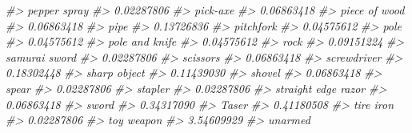 \documentclass[
]{krantz}
\makeatletter
\newenvironment{Shaded}{\begin{snugshade}}{\end{snugshade}}
\newcommand{\CommentTok}[1]{\textcolor[rgb]{0.37,0.37,0.37}{\textit{#1}}}
\newenvironment{kframe}{%
\medskip{}
\setlength{\fboxsep}{.8em}
 \def\at@end@of@kframe{}%
 \ifinner\ifhmode%
  \def\at@end@of@kframe{\end{minipage}}%
  \begin{minipage}{\columnwidth}%
 \fi\fi%
 \def\FrameCommand##1{\hskip\@totalleftmargin \hskip-\fboxsep
 \colorbox{shadecolor}{##1}\hskip-\fboxsep
     \hskip-\linewidth \hskip-\@totalleftmargin \hskip\columnwidth}%
 \MakeFramed {\advance\hsize-\width
   \@totalleftmargin\z@ \linewidth\hsize
   \@setminipage}}%
 {\par\unskip\endMakeFramed%
 \at@end@of@kframe}
\renewenvironment{Shaded}{\begin{kframe}}{\end{kframe}}
\makeatother
\begin{document}
\begin{Shaded}
\begin{Highlighting}[]
\CommentTok{\#\textgreater{}                     pepper spray }
\CommentTok{\#\textgreater{}                       0.02287806 }
\CommentTok{\#\textgreater{}                         pick{-}axe }
\CommentTok{\#\textgreater{}                       0.06863418 }
\CommentTok{\#\textgreater{}                    piece of wood }
\CommentTok{\#\textgreater{}                       0.06863418 }
\CommentTok{\#\textgreater{}                             pipe }
\CommentTok{\#\textgreater{}                       0.13726836 }
\CommentTok{\#\textgreater{}                        pitchfork }
\CommentTok{\#\textgreater{}                       0.04575612 }
\CommentTok{\#\textgreater{}                             pole }
\CommentTok{\#\textgreater{}                       0.04575612 }
\CommentTok{\#\textgreater{}                   pole and knife }
\CommentTok{\#\textgreater{}                       0.04575612 }
\CommentTok{\#\textgreater{}                             rock }
\CommentTok{\#\textgreater{}                       0.09151224 }
\CommentTok{\#\textgreater{}                    samurai sword }
\CommentTok{\#\textgreater{}                       0.02287806 }
\CommentTok{\#\textgreater{}                         scissors }
\CommentTok{\#\textgreater{}                       0.06863418 }
\CommentTok{\#\textgreater{}                      screwdriver }
\CommentTok{\#\textgreater{}                       0.18302448 }
\CommentTok{\#\textgreater{}                     sharp object }
\CommentTok{\#\textgreater{}                       0.11439030 }
\CommentTok{\#\textgreater{}                           shovel }
\CommentTok{\#\textgreater{}                       0.06863418 }
\CommentTok{\#\textgreater{}                            spear }
\CommentTok{\#\textgreater{}                       0.02287806 }
\CommentTok{\#\textgreater{}                          stapler }
\CommentTok{\#\textgreater{}                       0.02287806 }
\CommentTok{\#\textgreater{}              straight edge razor }
\CommentTok{\#\textgreater{}                       0.06863418 }
\CommentTok{\#\textgreater{}                            sword }
\CommentTok{\#\textgreater{}                       0.34317090 }
\CommentTok{\#\textgreater{}                            Taser }
\CommentTok{\#\textgreater{}                       0.41180508 }
\CommentTok{\#\textgreater{}                        tire iron }
\CommentTok{\#\textgreater{}                       0.02287806 }
\CommentTok{\#\textgreater{}                       toy weapon }
\CommentTok{\#\textgreater{}                       3.54609929 }
\CommentTok{\#\textgreater{}                          unarmed }

\end{Highlighting}
\end{Shaded}
\end{document}
